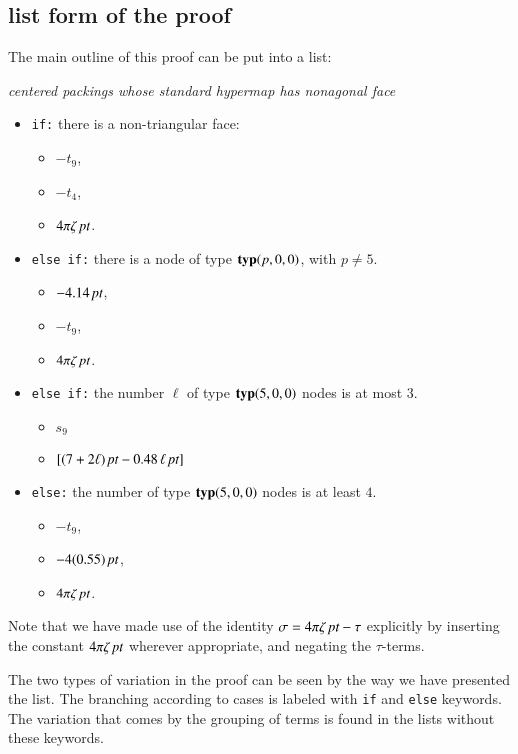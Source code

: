 \subsection{list form of the proof}

The main outline of this proof can be put into a list:
\bigskip

\centerline{\it centered packings whose standard hypermap has nonagonal face\hss}

\begin{itemize}
\item {\tt if:} there is a non-triangular face:
\begin{itemize}
\item $-t_9$,
\item $-t_4$,
\item $4\pi\zeta\,\hbox{\it pt}$.
\end{itemize}
\item {\tt else if:} there is a node of type ${\operatorname{\bf typ}}{(p,0,0)}$, with $p\ne 5$.
\begin{itemize}
\item $-4.14\,\hbox{\it pt}$,
\item $-t_9$,
\item $4\pi\zeta\,\hbox{\it pt}$.
\end{itemize}
\item {\tt else if:} the number $\ell$ of type ${\operatorname{\bf typ}}{(5,0,0)}$ nodes is at most $3$.
\begin{itemize}
\item $s_9$
\item $[(7+2\ell)\,\hbox{\it pt} - 0.48\,\ell\,\hbox{\it pt}]$
\end{itemize}
\item {\tt else:} the number of type ${\operatorname{\bf typ}}{(5,0,0)}$ nodes is at least $4$.
\begin{itemize}
\item $-t_9$,
\item $-4(0.55)\,\hbox{\it pt}$,
\item $4\pi\zeta\,\hbox{\it pt}$.
\end{itemize}
\end{itemize}

Note that we have made use of the identity
$\sigma = 4\pi\zeta\,\hbox{\it pt} - \tau$
explicitly by inserting the constant $4\pi\zeta\,\hbox{\it pt}$ wherever
appropriate, and negating the $\tau$-terms.

The two types of variation in the proof can be seen by the way
we have presented the list.  The branching according to cases
is labeled with {\tt if} and {\tt else} keywords.  The variation
that comes by the grouping of terms is found in the lists without
these keywords.  

